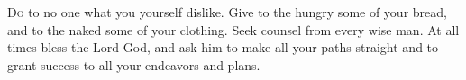 
\lettrine{D}{o} to no one what you yourself dislike. Give to the hungry some of your bread, and to the naked some of your clothing. Seek counsel from every wise man. At all times bless the Lord God, and ask him to make all your paths straight and to grant success to all your endeavors and plans.
